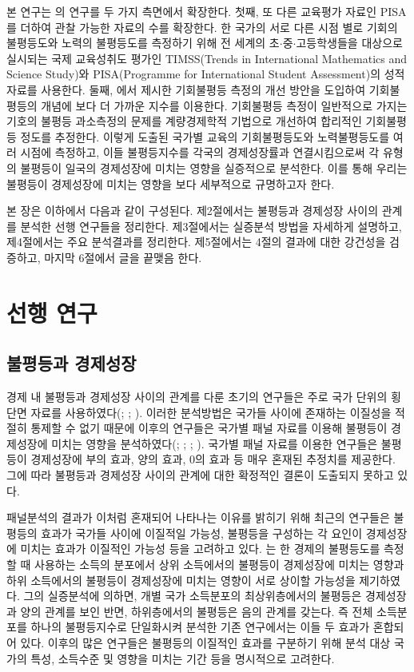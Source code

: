 본 연구는 \cite{kno17}의 연구를 두 가지 측면에서 확장한다.
첫째, 또 다른 교육평가 자료인 PISA를 더하여 관찰 가능한 자료의 수를 확장한다.
한 국가의 서로 다른 시점 별로 기회의 불평등도와 노력의 불평등도를 측정하기 위해 전 세계의 초$\cdot$중$\cdot$고등학생들을 대상으로 실시되는 국제 교육성취도 평가인 TIMSS(Trends in International Mathematics and Science Study)와 PISA(Programme for International Student Assessment)의 성적 자료를 사용한다.
둘째, \cite{betl12}에서 제시한 기회불평등 측정의 개선 방안을 도입하여 기회불평등의 개념에 보다 더 가까운 지수를 이용한다.
기회불평등 측정이 일반적으로 가지는 기호의 불평등 과소측정의 문제를 계량경제학적 기법으로 개선하여 합리적인 기회불평등 정도를 추정한다.  
이렇게 도출된 국가별 교육의 기회불평등도와 노력불평등도를 여러 시점에 측정하고, 이들 불평등지수를 각국의 경제성장률과 연결시킴으로써 각 유형의 불평등이 일국의 경제성장에 미치는 영향을 실증적으로 분석한다.
이를 통해 우리는 불평등이 경제성장에 미치는 영향을 보다 세부적으로 규명하고자 한다.

본 장은 이하에서 다음과 같이 구성된다.
제2절에서는 불평등과 경제성장 사이의 관계를 분석한 선행 연구들을 정리한다.
제3절에서는 실증분석 방법을 자세하게 설명하고, 제4절에서는 주요 분석결과를 정리한다.
제5절에서는 4절의 결과에 대한 강건성을 검증하고, 마지막 6절에서 글을 끝맺음 한다.

\section{선행 연구}
\subsection{불평등과 경제성장}
경제 내 불평등과 경제성장 사이의 관계를 다룬 초기의 연구들은 주로 국가 단위의 횡단면 자료를 사용하였다(\cite{barro91}; \cite{anr94}; \cite{pnt94}).
이러한 분석방법은 국가들 사이에 존재하는 이질성을 적절히 통제할 수 없기 때문에 이후의 연구들은 국가별 패널 자료를 이용해 불평등이 경제성장에 미치는 영향을 분석하였다(\cite{lnz98}; \cite{barro20}; \cite{forbes00}; \cite{bnd03}).
국가별 패널 자료를 이용한 연구들은 불평등이 경제성장에 부의 효과, 양의 효과, 0의 효과 등 매우 혼재된 추정치를 제공한다.
그에 따라 불평등과 경제성장 사이의 관계에 대한 확정적인 결론이 도출되지 못하고 있다.

패널분석의 결과가 이처럼 혼재되어 나타나는 이유를 밝히기 위해 최근의 연구들은 불평등의 효과가 국가들 사이에 이질적일 가능성, 불평등을 구성하는 각 요인이 경제성장에 미치는 효과가 이질적인 가능성 등을 고려하고 있다.
\cite{voit05, voit11}는 한 경제의 불평등도를 측정할 때 사용하는 소득의 분포에서 상위 소득에서의 불평등이 경제성장에 미치는 영향과 하위 소득에서의 불평등이 경제성장에 미치는 영향이 서로 상이할 가능성을 제기하였다.
그의 실증분석에 의하면, 개별 국가 소득분포의 최상위층에서의 불평등은 경제성장과 양의 관계를 보인 반면, 하위층에서의 불평등은 음의 관계를 갖는다.
즉 전체 소득분포를 하나의 불평등지수로 단일화시켜 분석한 기존 연구에서는 이들 두 효과가 혼합되어 있다.
\cite{voit05, voit11} 이후의 많은 연구들은 불평등의 이질적인 효과를 구분하기 위해 분석 대상 국가의 특성, 소득수준 및 영향을 미치는 기간 등을 명시적으로 고려한다.

